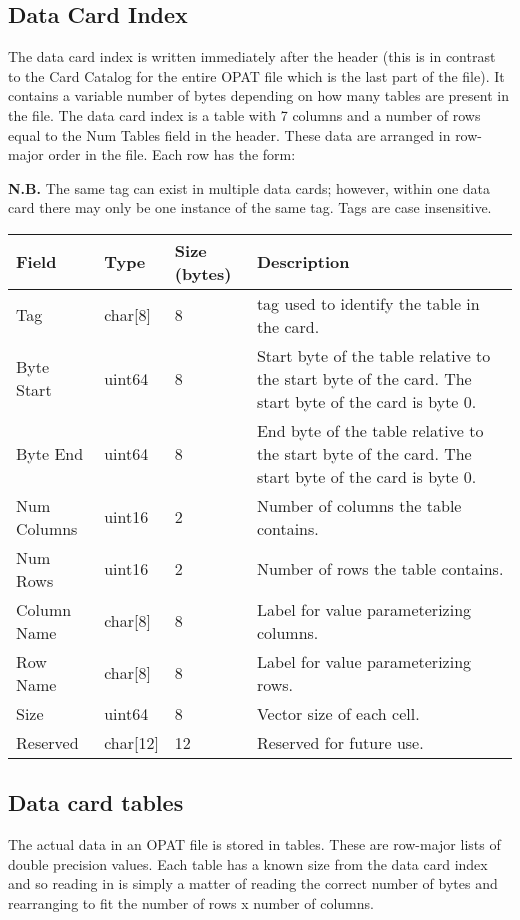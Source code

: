 \documentclass{article}
\begin{document}
\subsection{Data Card Index}
The data card index is written immediately after the header (this is in contrast
to the Card Catalog for the entire OPAT file which is the last part of the
file).  It contains a variable number of bytes depending on how many tables are
present in the file.  The data card index is a table with 7 columns and a
number of rows equal to the Num Tables field in the header.  These data are
arranged in row-major order in the file.  Each row has the form: 

\noindent\textbf{N.B.} The same tag can exist in multiple data cards;  however,
within one data card there may only be one instance of the same tag.  Tags are
case insensitive. 
\begin{longtable}{|l|l|l|p{5cm}|}
\hline
\textbf{Field} & \textbf{Type} & \textbf{Size (bytes)} & \textbf{Description} \\
\hline
  Tag & char[8] & 8 & tag used to identify the table in the card.  \\
  Byte Start & uint64 & 8 & Start byte of the table relative to the start byte of the card.  The start byte of the card is byte 0.  \\
  Byte End & uint64 & 8 & End byte of the table relative to the start byte of the card.  The start byte of the card is byte 0.  \\
  Num Columns & uint16 & 2 & Number of columns the table contains.  \\
  Num Rows & uint16 & 2 & Number of rows the table contains.  \\
  Column Name & char[8] & 8 & Label for value parameterizing columns.  \\
  Row Name & char[8] & 8 & Label for value parameterizing rows.  \\
  Size & uint64 & 8 & Vector size of each cell.  \\
  Reserved & char[12] & 12 & Reserved for future use.  \\
\hline
\end{longtable}

\subsection{Data card tables}
The actual data in an OPAT file is stored in tables.  These are row-major lists
of double precision values.  Each table has a known size from the data card
index and so reading in is simply a matter of reading the correct number of
bytes and rearranging to fit the number of rows x number of columns. 
\end{document}
